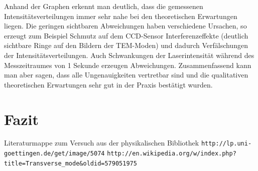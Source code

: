 \documentclass[bigchapter,colorback,accentcolor=tud4b,linedtoc,11pt]{tudreport}
\numberwithin{equation}{subsection}
\begin{document}
\FloatBarrier
Anhand der Graphen erkennt man deutlich, dass die gemessenen Intensitätsverteilungen immer sehr nahe bei den theoretischen Erwartungen liegen. Die geringen sichtbaren Abweichungen haben verschiedene Ursachen, so erzeugt zum Beispiel Schmutz auf dem CCD-Sensor Interferenzeffekte (deutlich sichtbare Ringe auf den Bildern der TEM-Moden) und dadurch Verfälschungen der Intensitätsverteilungen. Auch Schwankungen der Laserintensität während des Messzeitraumes von 1 Sekunde erzeugen Abweichungen. Zusammenfassend kann man aber sagen, dass alle Ungenauigkeiten vertretbar sind und die qualitativen theoretischen Erwartungen sehr gut in der Praxis bestätigt wurden.

\chapter{Fazit}



\cleardoublepage{}

\newpage

\begin{thebibliography}{100}
   Literaturmappe zum Versuch aus der physikalischen Bibliothek
   \verb|http://lp.uni-goettingen.de/get/image/5074|
   \verb|http://en.wikipedia.org/w/index.php?title=Transverse_mode&oldid=579051975|
\end{thebibliography}

\cleardoublepage{}
\listoffigures
\end{document}
